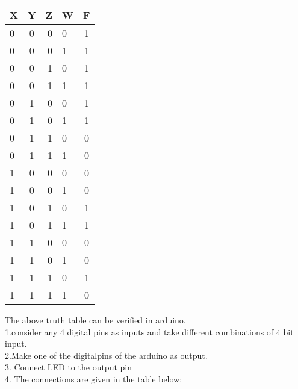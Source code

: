 \documentclass[10pt,a4paper]{report}
\begin{document}
\begin{multicols}{2}
  \begin{center}
    \label{tab:truthtable}
    \setlength{\arrayrulewidth}{0.5mm}
\setlength{\tabcolsep}{18pt}
\renewcommand{\arraystretch}{1.5}
    \begin{tabular}{|l|c|r|l|c|}
    \hline %
      \textbf{X} & \textbf{Y} & \textbf{Z} & \textbf{W} & \textbf{F}\\
      \hline
      0 & 0 & 0 & 0 & 1\\
      0 & 0 & 0 & 1 & 1\\
      0 & 0 & 1 & 0 & 1\\
      0 & 0 & 1 & 1 & 1\\
      0 & 1 & 0 & 0 & 1\\
      0 & 1 & 0 & 1 & 1\\
      0 & 1 & 1 & 0 & 0\\
      0 & 1 & 1 & 1 & 0\\
      1 & 0 & 0 & 0 & 0\\
      1 & 0 & 0 & 1 & 0\\
      1 & 0 & 1 & 0 & 1\\
      1 & 0 & 1 & 1 & 1\\
      1 & 1 & 0 & 0 & 0\\
      1 & 1 & 0 & 1 & 0\\
      1 & 1 & 1 & 0 & 1\\
      1 & 1 & 1 & 1 & 0\\
      \hline
      
    \end{tabular}
  \end{center}

 
 \raggedright The above truth table can be verified in arduino.\\1.consider any 4 digital pins as inputs and take different combinations of 4 bit input.\\2.Make one of the digitalpins of the arduino as output.\\3. Connect LED to the output pin \\4. The connections are given in the table below:


\end{multicols}
\end{document}
